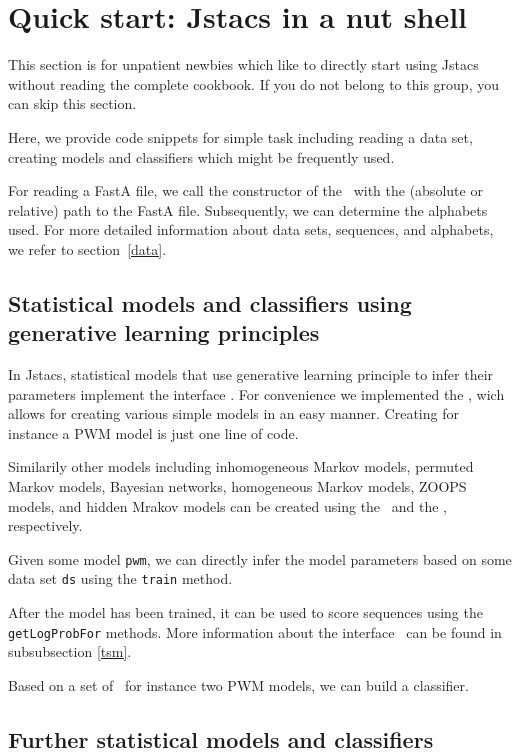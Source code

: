 \section{Quick start: Jstacs in a nut shell}\label{start}
\renewcommand{\codefile}{recipes/TrainPWM.java}
This section is for unpatient newbies which like to directly start using Jstacs without reading the complete cookbook. If you do not belong to this group, you can skip this section.

Here, we provide code snippets for simple task including reading a data set, creating models and classifiers which might be frequently used.

For reading a FastA file, we call the constructor of the \DNADataSet~with the (absolute or relative) path to the FastA file. Subsequently, we can determine the alphabets used.
\setcounter{off}{37}
For more detailed information about data sets, sequences, and alphabets, we refer to section~\ref{data}.

\subsection{Statistical models and classifiers using generative learning principles}

In Jstacs, statistical models that use generative learning principle to infer their parameters implement the interface \TrainSM. For convenience we implemented the \TrainSMFactory, wich allows for creating various simple models in an easy manner. Creating for instance a PWM model is just one line of code.
\addtocounter{off}{3}
Similarily other models including inhomogeneous Markov models, permuted Markov models, Bayesian networks, homogeneous Markov models, ZOOPS models, and hidden Mrakov models can be created using the \TrainSMFactory~and the \HMMFactory, respectively.

Given some model \lstinline+pwm+, we can directly infer the model parameters based on some data set \lstinline+ds+ using the \lstinline+train+ method.
\addtocounter{off}{2}
After the model has been trained, it can be used to score sequences using the \lstinline+getLogProbFor+ methods. More information about the interface \TrainSM~can be found in subsubsection \ref{tsm}.

Based on a set of \TrainSM~for instance two PWM models, we can build a classifier.
\renewcommand{\codefile}{\defaultcodefile}
\setcounter{off}{554}

\subsection{Further statistical models and classifiers}

